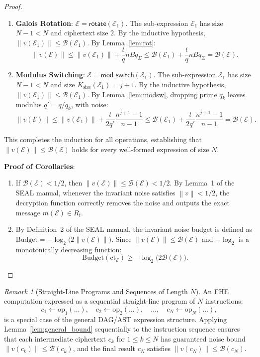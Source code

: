 \documentclass[11pt]{article}
\theoremstyle{definition}
\theoremstyle{remark}
\newtheorem{remark}{Remark}
\newcommand{\norm}[1]{\left\lVert #1\right\rVert}
\newcommand{\ct}{\mathrm{ct}}
\newcommand{\Sgeo}[1]{\frac{n^{#1+1}-1}{n-1}}
\begin{document}
\begin{proof}
\begin{enumerate}[leftmargin=2em]
\item \textbf{Galois Rotation}: $\mathcal{E} = \mathsf{rotate}(\mathcal{E}_1)$.
      The sub-expression $\mathcal{E}_1$ has size $N-1 < N$ and ciphertext size $2$.
      By the inductive hypothesis, $\norm{v(\mathcal{E}_1)} \leq \mathcal{B}(\mathcal{E}_1)$.
      By Lemma~\ref{lem:rot}:
      \[
        \norm{v(\mathcal{E})} \leq \norm{v(\mathcal{E}_1)} + \frac{t}{q}nBq_\Sigma \leq \mathcal{B}(\mathcal{E}_1) + \frac{t}{q}nBq_\Sigma = \mathcal{B}(\mathcal{E}).
      \]

\item \textbf{Modulus Switching}: $\mathcal{E} = \mathsf{mod\_switch}(\mathcal{E}_1)$.
      The sub-expression $\mathcal{E}_1$ has size $N-1 < N$ and size $K_{\mathrm{size}}(\mathcal{E}_1) = j+1$.
      By the inductive hypothesis, $\norm{v(\mathcal{E}_1)} \leq \mathcal{B}(\mathcal{E}_1)$.
      By Lemma~\ref{lem:modsw}, dropping prime $q_k$ leaves modulus $q' = q/q_k$, with noise:
      \[
        \norm{v(\mathcal{E})} \leq \norm{v(\mathcal{E}_1)} + \frac{t}{2q'}\Sgeo{j} \leq \mathcal{B}(\mathcal{E}_1) + \frac{t}{2q'}\Sgeo{j} = \mathcal{B}(\mathcal{E}).
      \]
\end{enumerate}
This completes the induction for all operations, establishing that $\norm{v(\mathcal{E})} \leq \mathcal{B}(\mathcal{E})$ holds for every well-formed expression of size $N$.

\textbf{Proof of Corollaries}:
\begin{enumerate}[leftmargin=2em,label=(\roman*)]
\item If $\mathcal{B}(\mathcal{E}) < 1/2$, then $\norm{v(\mathcal{E})} \leq \mathcal{B}(\mathcal{E}) < 1/2$.
      By Lemma~1 of the SEAL manual, whenever the invariant noise satisfies $\norm{v} < 1/2$, the decryption function correctly removes the noise and outputs the exact message $m(\mathcal{E}) \in R_t$.
\item By Definition~2 of the SEAL manual, the invariant noise budget is defined as $\mathrm{Budget} = -\log_2\bigl(2\norm{v(\mathcal{E})}\bigr)$.
      Since $\norm{v(\mathcal{E})} \leq \mathcal{B}(\mathcal{E})$ and $-\log_2$ is a monotonically decreasing function:
      \[
        \mathrm{Budget}(\ct_{\mathcal{E}}) \geq -\log_2\bigl(2\mathcal{B}(\mathcal{E})\bigr).
      \]
\end{enumerate}
\end{proof}

\begin{remark}[Straight-Line Programs and Sequences of Length $N$]
An FHE computation expressed as a sequential straight-line program of $N$ instructions:
\[
  c_1 \leftarrow \mathrm{op}_1(\dots), \quad c_2 \leftarrow \mathrm{op}_2(\dots), \quad \dots, \quad c_N \leftarrow \mathrm{op}_N(\dots),
\]
is a special case of the general DAG/AST expression structure.
Applying Lemma~\ref{lem:general_bound} sequentially to the instruction sequence ensures that each intermediate ciphertext $c_k$ for $1 \leq k \leq N$ has guaranteed noise bound $\norm{v(c_k)} \leq \mathcal{B}(c_k)$, and the final result $c_N$ satisfies $\norm{v(c_N)} \leq \mathcal{B}(c_N)$.
\end{remark}
\end{document}
